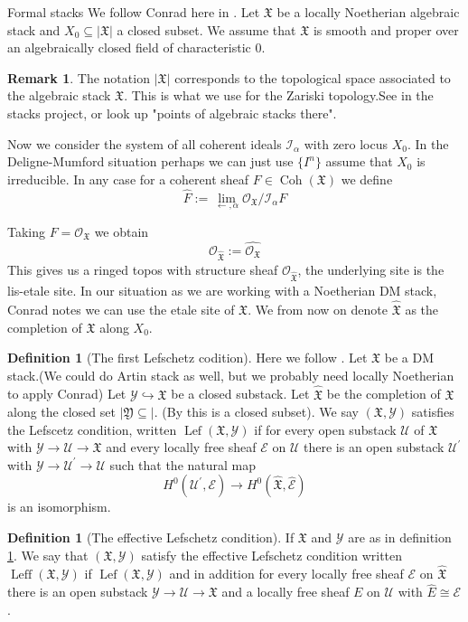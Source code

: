 \documentclass[letterpaper,10pt]{amsart}
\newcommand{\E}{{\mathcal{E}}}
\newcommand{\I}{{\mathcal{I}}}
\renewcommand{\O}{{\mathcal{O}}}
\newcommand{\UUU}{{\mathcal{U}}}
\newcommand{\Y}{{\mathcal{Y}}}
\newcommand{\fX}{\mathfrak{X}}
\newcommand{\fY}{\mathfrak{Y}}
\newcommand{\ra}{\rightarrow}
\newcommand{\Lef}{\operatorname{Lef}}
\newcommand{\Leff}{\operatorname{Leff}}
\newcommand{\Coh}{\operatorname{Coh}}
\newcommand{\fO}{\O_{\widehat{\fX}}}
\newcommand{\ffX}{\widehat{\fX}}
\theoremstyle{definition}
\newtheorem{definition}[theorem]{Definition}
\newtheorem{remark}[theorem]{Remark}
\newtheorem*{proof of (1)}{proof of (1)}
\newtheorem*{proof of (2)}{proof of (2)}
\newtheorem{informal question}[theorem]{Informal Question}
\numberwithin{equation}{section}
\begin{document}
\title{}

\begin{section}{Formal stacks}
 We follow Conrad here in \cite{conrad2005formal}. Let $\fX$ be a locally Noetherian algebraic stack and 
 $X_0\subseteq \vert \fX\vert$ a closed subset. We assume that $\fX$ is smooth and proper over an algebraically closed field
 of characteristic 0. 
\begin{remark}
The notation $\vert \fX\vert$ corresponds to the topological space associated to the algebraic stack $\fX$. This is what we use for the
Zariski topology.See \cite[tag 04XE ]{stacks-project} in the stacks project, or look up "points of algebraic stacks there".
\end{remark}

 Now we consider the system of all coherent ideals $\I_\alpha$ with zero locus $X_0$. In the Deligne-Mumford situation perhaps we can just
 use $\{I^n\}$ assume that $X_0$ is irreducible. In any case for a coherent sheaf $F\in \Coh(\fX)$ we define
 \[\widehat{F}:=\lim_{\leftarrow, \alpha}\O_{\fX}/\I_\alpha F\] 

 Taking $F=\O_\fX$ we obtain \[\O_{\widehat{\fX}}:=\widehat{\O_\fX}\]
 This gives us a ringed topos with structure sheaf $\fO$, the underlying site is the lis-etale site. In our situation as we are working with a
 Noetherian DM stack, Conrad notes we can use the etale site of $\fX$. We from now on denote $\ffX$ as the completion of $\fX$ along $X_0$.
 

\begin{definition}[The first Lefschetz codition]\label{def:Lef}
    Here we follow \cite[Chapter IV]{AmpleSUb}. Let $\fX$ be a DM stack.(We could do Artin stack as well, but we probably need locally Noetherian to apply Conrad) Let $\Y\hookrightarrow \fX$ be a closed substack. Let $\ffX$ be the completion of
    $\fX$ along the closed set $\vert \fY\subseteq \vert$. (By \cite[tag 0H20]{stacks-project} this is a closed subset). We say $(\fX,\Y)$ satisfies
    the Lefscetz condition, written $\Lef(\fX,\Y)$  if for every open substack $\UUU$ of $\fX$ with $\Y\ra\UUU\ra \fX$ and every locally free sheaf $\E$ on $\UUU$ 
    there is an open substack $\UUU^\prime$ with $\Y\ra \UUU^\prime\ra \UUU$ such that the natural map 
    \[H^0(\UUU^\prime,\E)\ra H^0(\widehat{\fX},\widehat{\E})\] is an isomorphism.   

\end{definition}

\begin{definition}[The effective Lefschetz condition]\label{def:Leff}
If $\fX$ and $\Y$ are as in definition \ref{def:Lef}. We say that $(\fX,\Y)$ satisfy the effective Lefschetz condition written $\Leff(\fX,\Y)$
if $\Lef(\fX,\Y)$ and in addition for every locally free sheaf $\E$ on $\widehat{\fX}$ there is an open substack $\Y\ra \UUU\ra \fX$ 
and a locally free sheaf $E$ on $\UUU$ with $\widehat{E}\cong \E$.  
    

\end{definition}
\end{section}
\end{document}
